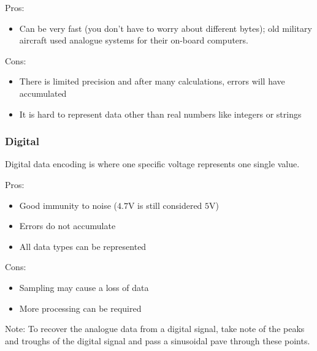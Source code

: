 \medskip
\begin{minipage}[t]{0.45\linewidth}
	Pros:
	\begin{itemize}
		\item Can be very fast (you don't have to worry about different bytes); old military aircraft used analogue systems for their on-board computers.
	\end{itemize}
\end{minipage}
\hfill
\begin{minipage}[t]{0.45\linewidth}
	Cons:
	\begin{itemize}
		\item There is limited precision and after many calculations, errors will have accumulated
		\item It is hard to represent data other than real numbers like integers or strings
	\end{itemize}
\end{minipage}

\subsubsection{Digital}\label{ssub:digital}

Digital data encoding is where one specific voltage represents one single value.

\medskip
\begin{minipage}[t]{0.45\linewidth}
	Pros:
	\begin{itemize}
		\item Good immunity to noise (\(4.7\)V is still considered \(5\)V)
		\item Errors do not accumulate
		\item All data types can be represented
	\end{itemize}
\end{minipage}
\hfill
\begin{minipage}[t]{0.45\linewidth}
	Cons:
	\begin{itemize}
		\item Sampling may cause a loss of data
		\item More processing can be required
	\end{itemize}
\end{minipage}

\begin{note}
	Note: To recover the analogue data from a digital signal, take note of the peaks and troughs of the digital signal and pass a sinusoidal pave through these points.
\end{note}

